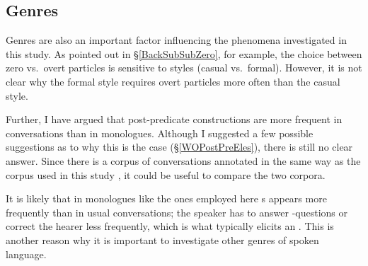 \subsection{Genres}

Genres are also an important factor influencing the phenomena investigated in this study.
As pointed out in \S \ref{BackSubSubZero},
for example,
the choice between zero vs.~overt particles is sensitive to
styles (casual vs.~formal).
However, it is not clear why the formal style requires overt particles more often than the casual style.

Further, I have argued that
post-predicate constructions are more frequent in conversations than in monologues.
Although I suggested a few possible suggestions as to why this is the case (\S \ref{WOPostPreEles}),
there is still no clear answer.
Since there is a corpus of conversations annotated in the same way as the corpus used in this study \cite{nakagawaden12},
it could be useful to compare the two corpora.

It is likely that in monologues like the ones employed here s appears more frequently than in usual conversations;
 the speaker has to answer -questions or correct the hearer less frequently, which is what typically elicits an .
This is another reason why it is important to investigate other genres of spoken language. %



